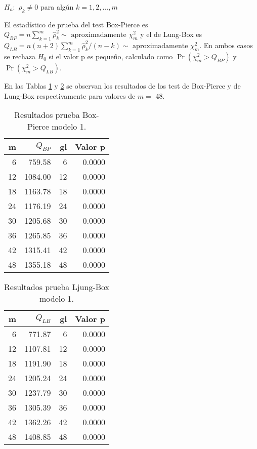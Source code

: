 \documentclass{tufte-handout}
\begin{document}
$H_a:$ $\rho_k \neq 0$ para algún $k=1,2,...,m$

El estadístico de prueba del test Box-Pierce es $Q_{BP}=n \sum_{k=1}^m \hat{\rho}_k^2 \sim \text{ aproximadamente } \chi_m^2$ y el de Lung-Box es $Q_{LB}=n(n+2) \sum_{k=1}^m \hat{\rho}_k^2/(n-k) \sim \text{ aproximadamente } \chi_m^2$. En ambos casos se rechaza $H_0$ si el valor p es pequeño, calculado como $\Pr(\chi_m^2 >Q_{BP})$ y $\Pr(\chi_m^2 >Q_{LB})$.

En las Tablas \ref{tab:p2_bp} y \ref{tab:p2_lb} se observan los resultados de los test de Box-Pierce y de Lung-Box respectivamente para valores de $m=$ 48.

\begin{table}[ht]
\centering
\begin{tabular}{rrrr}
  \hline
m & $Q_{BP}$ & gl & Valor p \\ 
  \hline
6 & 759.58 & 6 & 0.0000 \\ 
  12 & 1084.00 & 12 & 0.0000 \\ 
  18 & 1163.78 & 18 & 0.0000 \\ 
  24 & 1176.19 & 24 & 0.0000 \\ 
  30 & 1205.68 & 30 & 0.0000 \\ 
  36 & 1265.85 & 36 & 0.0000 \\ 
  42 & 1315.41 & 42 & 0.0000 \\ 
  48 & 1355.18 & 48 & 0.0000 \\ 
   \hline
\end{tabular}
\caption{Resultados prueba Box-Pierce modelo 1.} 
\label{tab:p2_bp}
\end{table}

\begin{table}[ht]
\centering
\begin{tabular}{rrrr}
  \hline
m & $Q_{LB}$ & gl & Valor p \\ 
  \hline
6 & 771.87 & 6 & 0.0000 \\ 
  12 & 1107.81 & 12 & 0.0000 \\ 
  18 & 1191.90 & 18 & 0.0000 \\ 
  24 & 1205.24 & 24 & 0.0000 \\ 
  30 & 1237.79 & 30 & 0.0000 \\ 
  36 & 1305.39 & 36 & 0.0000 \\ 
  42 & 1362.26 & 42 & 0.0000 \\ 
  48 & 1408.85 & 48 & 0.0000 \\ 
   \hline
\end{tabular}
\caption{Resultados prueba Ljung-Box modelo 1.} 
\label{tab:p2_lb}
\end{table}
\end{document}
